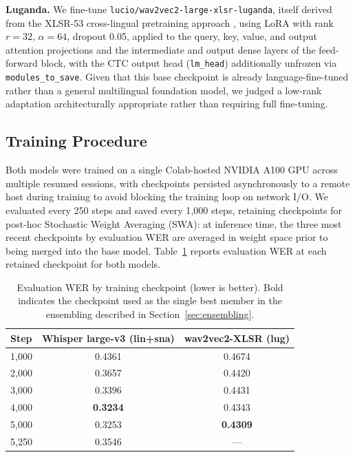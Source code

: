 \documentclass[11pt]{article}
\begin{document}
\textbf{Luganda.} We fine-tune \texttt{lucio/wav2vec2-large-xlsr-luganda}, itself derived from the XLSR-53 cross-lingual pretraining approach \cite{conneau2021xlsr}, using LoRA with rank $r=32$, $\alpha=64$, dropout 0.05, applied to the query, key, value, and output attention projections and the intermediate and output dense layers of the feed-forward block, with the CTC output head (\texttt{lm\_head}) additionally unfrozen via \texttt{modules\_to\_save}. Given that this base checkpoint is already language-fine-tuned rather than a general multilingual foundation model, we judged a low-rank adaptation architecturally appropriate rather than requiring full fine-tuning.

\subsection{Training Procedure}
\label{sec:training}

Both models were trained on a single Colab-hosted NVIDIA A100 GPU across multiple resumed sessions, with checkpoints persisted asynchronously to a remote host during training to avoid blocking the training loop on network I/O. We evaluated every 250 steps and saved every 1{,}000 steps, retaining checkpoints for post-hoc Stochastic Weight Averaging (SWA): at inference time, the three most recent checkpoints by evaluation WER are averaged in weight space prior to being merged into the base model. Table~\ref{tab:checkpoints} reports evaluation WER at each retained checkpoint for both models.

\begin{table}[htbp]
\centering
\caption{Evaluation WER by training checkpoint (lower is better). Bold indicates the checkpoint used as the single best member in the ensembling described in Section~\ref{sec:ensembling}.}
\label{tab:checkpoints}
\begin{tabular}{lcc}
\toprule
Step & Whisper large-v3 (lin+sna) & wav2vec2-XLSR (lug) \\
\midrule
1{,}000 & 0.4361 & 0.4674 \\
2{,}000 & 0.3657 & 0.4420 \\
3{,}000 & 0.3396 & 0.4431 \\
4{,}000 & \textbf{0.3234} & 0.4343 \\
5{,}000 & 0.3253 & \textbf{0.4309} \\
5{,}250 & 0.3546 & --- \\
\bottomrule
\end{tabular}
\end{table}
\end{document}
